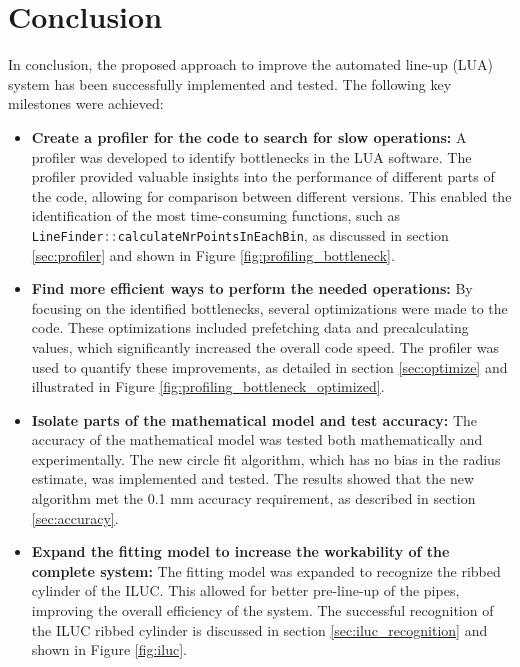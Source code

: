 \section{Conclusion}
\label{sec:conclusion}

In conclusion, the proposed approach to improve the automated line-up (LUA) system has been successfully implemented and tested. The following key milestones were achieved:

\begin{itemize}
    \item \textbf{Create a profiler for the code to search for slow operations:} A profiler was developed to identify bottlenecks in the LUA software. The profiler provided valuable insights into the performance of different parts of the code, allowing for comparison between different versions. This enabled the identification of the most time-consuming functions, such as \lstinline[language=c]|LineFinder::calculateNrPointsInEachBin|, as discussed in section \ref{sec:profiler} and shown in Figure \ref{fig:profiling_bottleneck}.
    
    \item \textbf{Find more efficient ways to perform the needed operations:} By focusing on the identified bottlenecks, several optimizations were made to the code. These optimizations included prefetching data and precalculating values, which significantly increased the overall code speed. The profiler was used to quantify these improvements, as detailed in section \ref{sec:optimize} and illustrated in Figure \ref{fig:profiling_bottleneck_optimized}.
    
    \item \textbf{Isolate parts of the mathematical model and test accuracy:} The accuracy of the mathematical model was tested both mathematically and experimentally. The new circle fit algorithm, which has no bias in the radius estimate, was implemented and tested. The results showed that the new algorithm met the 0.1 mm accuracy requirement, as described in section \ref{sec:accuracy}.
    
    \item \textbf{Expand the fitting model to increase the workability of the complete system:} The fitting model was expanded to recognize the ribbed cylinder of the ILUC. This allowed for better pre-line-up of the pipes, improving the overall efficiency of the system. The successful recognition of the ILUC ribbed cylinder is discussed in section \ref{sec:iluc_recognition} and shown in Figure \ref{fig:iluc}.
    
\end{itemize}

